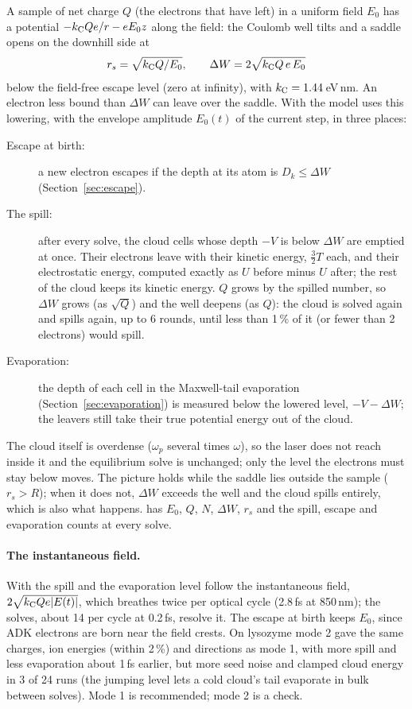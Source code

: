 A sample of net charge $Q$ (the electrons that have left) in a uniform field $E_0$ has a potential
$-k_{\mathrm C} Qe/r - eE_0 z$ along the field: the Coulomb well tilts and a saddle opens on the downhill side at
\begin{equation}
  r_s = \sqrt{k_{\mathrm C} Q/E_0},\qquad \Delta W = 2\sqrt{k_{\mathrm C} Q\,e\,E_0}
\end{equation}
below the field-free escape level (zero at infinity), with $k_{\mathrm C} = 1.44$\,eV\,nm.
An electron less bound than $\Delta W$ can leave over the saddle.
With  the model uses this lowering, with the envelope amplitude $E_0(t)$ of the current
step, in three places:
\begin{description}
  \item[Escape at birth:] a new electron escapes if the depth at its atom is $D_k\le\Delta W$ (Section~\ref{sec:escape}).
  \item[The spill:] after every solve, the cloud cells whose depth $-V$ is below $\Delta W$ are emptied at once.
    Their electrons leave with their kinetic energy, $\frac32T$ each, and their electrostatic energy, computed exactly
    as $U$ before minus $U$ after; the rest of the cloud keeps its kinetic energy.
    $Q$ grows by the spilled number, so $\Delta W$ grows (as $\sqrt Q$) and the well deepens (as $Q$): the cloud is
    solved again and spills again, up to 6 rounds, until less than 1\,\% of it (or fewer than 2 electrons) would
    spill.
  \item[Evaporation:] the depth of each cell in the Maxwell-tail evaporation (Section~\ref{sec:evaporation}) is
    measured below the lowered level, $-V-\Delta W$; the leavers still take their true potential energy out of the
    cloud.
\end{description}
The cloud itself is overdense ($\omega_p$ several times $\omega$), so the laser does not reach inside it and the
equilibrium solve is unchanged; only the level the electrons must stay below moves.
The picture holds while the saddle lies outside the sample ($r_s>R$); when it does not, $\Delta W$ exceeds the well and
the cloud spills entirely, which is also what happens.
 has $E_0$, $Q$, $N$, $\Delta W$, $r_s$ and the spill, escape and evaporation counts at every solve.

\paragraph{The instantaneous field.}
With  the spill and the evaporation level follow the instantaneous field,
$2\sqrt{k_{\mathrm C} Q e|E(t)|}$, which breathes twice per optical cycle (2.8\,fs at 850\,nm); the solves, about 14 per cycle at
0.2\,fs, resolve it.
The escape at birth keeps $E_0$, since ADK electrons are born near the field crests.
On lysozyme mode 2 gave the same charges, ion energies (within 2\,\%) and directions as mode 1, with more spill and
less evaporation about 1\,fs earlier, but more seed noise and clamped cloud energy in 3 of 24 runs (the jumping level
lets a cold cloud's tail evaporate in bulk between solves).
Mode 1 is recommended; mode 2 is a check.

